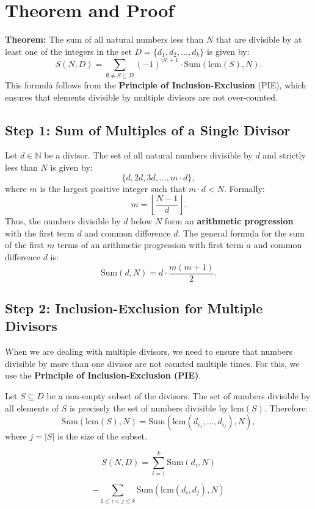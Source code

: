 \documentclass{article}
\begin{document}
\section*{Theorem and Proof}
\textbf{Theorem:}  
The sum of all natural numbers less than \( N \) that are divisible by at least one of the integers in the set \( D = \{d_1, d_2, \ldots, d_k\} \) is given by:
\[
S(N, D) = \sum_{\emptyset \neq S \subseteq D} (-1)^{|S| + 1} \cdot \text{Sum}(\text{lcm}(S), N).
\]
This formula follows from the \textbf{Principle of Inclusion-Exclusion} (PIE), which ensures that elements divisible by multiple divisors are not over-counted.

\subsection*{Step 1: Sum of Multiples of a Single Divisor}
Let \( d \in \mathbb{N} \) be a divisor. The set of all natural numbers divisible by \( d \) and strictly less than \( N \) is given by:
\[
\{d, 2d, 3d, \ldots, m \cdot d\},
\]
where \( m \) is the largest positive integer such that \( m \cdot d < N \). Formally:
\[
m = \left\lfloor \frac{N - 1}{d} \right\rfloor.
\]
Thus, the numbers divisible by \( d \) below \( N \) form an \textbf{arithmetic progression} with the first term \( d \) and common difference \( d \). The general formula for the sum of the first \( m \) terms of an arithmetic progression with first term \( a \) and common difference \( d \) is:
\[
\text{Sum}(d, N) = d \cdot \frac{m (m + 1)}{2}.
\]

\subsection*{Step 2: Inclusion-Exclusion for Multiple Divisors}
When we are dealing with multiple divisors, we need to ensure that numbers divisible by more than one divisor are not counted multiple times. For this, we use the \textbf{Principle of Inclusion-Exclusion (PIE)}.

Let \( S \subseteq D \) be a non-empty subset of the divisors. The set of numbers divisible by all elements of \( S \) is precisely the set of numbers divisible by \( \text{lcm}(S) \). Therefore:
\[
\text{Sum}(\text{lcm}(S), N) = \text{Sum}\left(\text{lcm}(d_{i_1}, \ldots, d_{i_j}), N\right),
\]
where \( j = |S| \) is the size of the subset.

\[
S(N, D) =
\sum_{i=1}^{k} \text{Sum}(d_i, N)
\]

\[
- \sum_{1 \leq i < j \leq k} \text{Sum}(\text{lcm}(d_i, d_j), N)
\]
\end{document}
